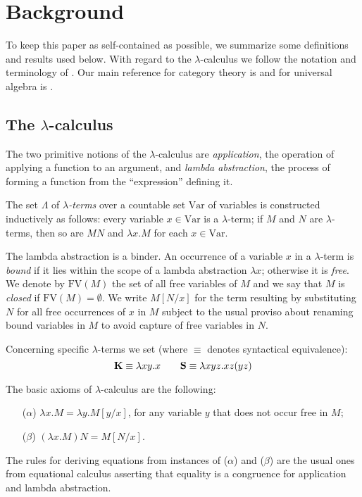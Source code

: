 \documentclass[english]{llncs}
\newcommand{\Var}{\mathrm{Var}}
\newcommand{\FV}{\mathrm{FV}}
\newcommand{\subst}[3]{#1[#3/#2]}
\newcommand{\gl}{\lambda}
\newcommand\ssK{{\bf K}}
\newcommand\ssS{{\bf S}}
\begin{document}
\section{Background}\label{sec:Preliminaries}

To keep this paper as self-contained as possible, we summarize some definitions and results used below. 
With regard to the $\gl$-calculus we follow the notation and terminology of \cite{Bare}. 
Our main reference for category theory is \cite{MacLaneS71} and for universal algebra is \cite{BurrisS81}.

\subsection{The $\gl$-calculus}

The two primitive notions of the $\lambda$-calculus are \emph{application}, the operation of applying a function to an argument, and 
\emph{lambda abstraction}, the process of forming a function from the ``expression'' defining it.

The set $\Lambda$ of {\em $\gl$-terms} over a countable set $\Var$ of variables is constructed inductively as follows: 
every variable $x\in\Var$ is a $\lambda$-term; if $M$ and $N$ are $\lambda$-terms, then so are $MN$ and $\lambda x.M$ for each $x\in\Var$.

The lambda abstraction is a binder. An occurrence of a variable $x$ in a $\gl$-term is \emph{bound} if it lies within the scope of a 
lambda abstraction $\gl x$; otherwise it is \emph{free}.
We denote by $\FV(M)$ the set of all free variables of $M$ and we say that $M$ is {\em closed} if $\FV(M)=\emptyset$.
We write $M[N/x]$ for the term resulting by substituting $N$ for all free occurrences of $x$ in $M$ subject to the usual proviso about renaming bound variables
in $M$ to avoid capture of free variables in $N$.

Concerning specific $\lambda$-terms we set (where $\equiv$ denotes syntactical equivalence):
$$
    \ssK\equiv\gl xy.x\qquad \ssS\equiv \gl xyz.xz(yz)
$$

The basic axioms of $\lambda$-calculus are the following:
\begin{itemize}
\item [($\alpha$)] $\lambda x.M = \lambda y.\subst{M}{x}{y}$, for any variable $y$ that does not occur free in $M$;
\item [($\beta$)] $(\lambda x.M)N = \subst{M}{x}{N}$.
\end{itemize}
The rules for deriving equations from instances of ($\alpha$) and ($\beta$) are the usual ones from equational calculus asserting that equality is a
congruence for application and lambda abstraction. 
\end{document}
